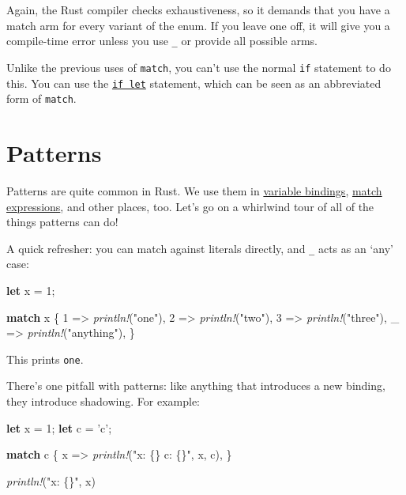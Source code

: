 \documentclass[a4paper,]{book}
\newenvironment{Shaded}{\begin{snugshade}}{\end{snugshade}}
\newcommand{\KeywordTok}[1]{\textcolor[rgb]{0.13,0.29,0.53}{\textbf{{#1}}}}
\newcommand{\DecValTok}[1]{\textcolor[rgb]{0.00,0.00,0.81}{{#1}}}
\newcommand{\CharTok}[1]{\textcolor[rgb]{0.31,0.60,0.02}{{#1}}}
\newcommand{\StringTok}[1]{\textcolor[rgb]{0.31,0.60,0.02}{{#1}}}
\newcommand{\PreprocessorTok}[1]{\textcolor[rgb]{0.56,0.35,0.01}{\textit{{#1}}}}
\newcommand{\NormalTok}[1]{{#1}}
\begin{document}
Again, the Rust compiler checks exhaustiveness, so it demands that you
have a match arm for every variant of the enum. If you leave one off, it
will give you a compile-time error unless you use \texttt{\_} or provide
all possible arms.

Unlike the previous uses of \texttt{match}, you can't use the normal
\texttt{if} statement to do this. You can use the
\protect\hyperlink{sec--if-let}{\texttt{if\ let}} statement, which can
be seen as an abbreviated form of \texttt{match}.

\hypertarget{sec--patterns}{\section{Patterns}\label{sec--patterns}}

Patterns are quite common in Rust. We use them in
\protect\hyperlink{sec--variable-bindings}{variable bindings},
\protect\hyperlink{sec--match}{match expressions}, and other places,
too. Let's go on a whirlwind tour of all of the things patterns can do!

A quick refresher: you can match against literals directly, and
\texttt{\_} acts as an `any' case:

\begin{Shaded}
\begin{Highlighting}[]
\KeywordTok{let} \NormalTok{x = }\DecValTok{1}\NormalTok{;}

\KeywordTok{match} \NormalTok{x \{}
    \DecValTok{1} \NormalTok{=> }\PreprocessorTok{println!}\NormalTok{(}\StringTok{"one"}\NormalTok{),}
    \DecValTok{2} \NormalTok{=> }\PreprocessorTok{println!}\NormalTok{(}\StringTok{"two"}\NormalTok{),}
    \DecValTok{3} \NormalTok{=> }\PreprocessorTok{println!}\NormalTok{(}\StringTok{"three"}\NormalTok{),}
    \NormalTok{_ => }\PreprocessorTok{println!}\NormalTok{(}\StringTok{"anything"}\NormalTok{),}
\NormalTok{\}}
\end{Highlighting}
\end{Shaded}

This prints \texttt{one}.

There's one pitfall with patterns: like anything that introduces a new
binding, they introduce shadowing. For example:

\begin{Shaded}
\begin{Highlighting}[]
\KeywordTok{let} \NormalTok{x = }\DecValTok{1}\NormalTok{;}
\KeywordTok{let} \NormalTok{c = }\CharTok{'c'}\NormalTok{;}

\KeywordTok{match} \NormalTok{c \{}
    \NormalTok{x => }\PreprocessorTok{println!}\NormalTok{(}\StringTok{"x: \{\} c: \{\}"}\NormalTok{, x, c),}
\NormalTok{\}}

\PreprocessorTok{println!}\NormalTok{(}\StringTok{"x: \{\}"}\NormalTok{, x)}
\end{Highlighting}
\end{Shaded}
\end{document}
